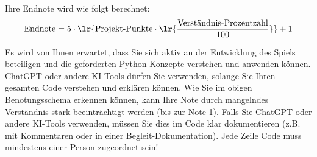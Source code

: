 Ihre Endnote wird wie folgt berechnet:
\[\text{Endnote} = 5 \cdot \lr{ \text{Projekt-Punkte} \cdot \lr{\frac{\text{Verständnis-Prozentzahl}}{100}}} + 1\]

\begin{myattention}[KI-Tools]
    Es wird von Ihnen erwartet, dass Sie sich aktiv an der Entwicklung des Spiels beteiligen und die geforderten Python-Konzepte verstehen und anwenden können. ChatGPT oder andere KI-Tools dürfen Sie verwenden, solange Sie Ihren gesamten Code verstehen und erklären können. Wie Sie im obigen Benotungsschema erkennen können, kann Ihre Note durch mangelndes Verständnis stark beeinträchtigt werden (bis zur Note 1). Falls Sie ChatGPT oder andere KI-Tools verwenden, müssen Sie dies im Code klar dokumentieren (z.B. mit Kommentaren oder in einer Begleit-Dokumentation). Jede Zeile Code muss mindestens einer Person zugeordnet sein!
\end{myattention}


